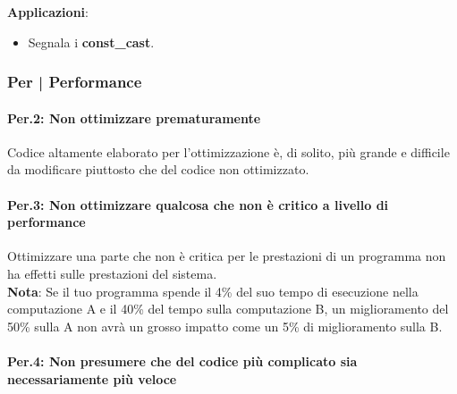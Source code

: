 \textsf{\small \textbf{Applicazioni}: }

\begin{itemize}
	\item \textsf{\small Segnala i \textbf{const\_cast}.}
\end{itemize}


\newpage

\subsubsection{Per | Performance}

\paragraph{Per.2: Non ottimizzare prematuramente}

\label{Per_2}

\textsf{\small Codice altamente elaborato per l'ottimizzazione è, di solito, più grande e difficile da modificare piuttosto che del codice non ottimizzato.} \\


\paragraph{Per.3: Non ottimizzare qualcosa che non è critico a livello di performance}

\textsf{\small Ottimizzare una parte che non è critica per le prestazioni di un programma non ha effetti sulle prestazioni del sistema. } \\

\textsf{\small \textbf{Nota}: Se il tuo programma spende il 4\% del suo tempo di esecuzione nella computazione A e il 40\% del tempo sulla computazione B, un miglioramento del 50\% sulla A non avrà un grosso impatto come un 5\% di miglioramento sulla B. } \\

\paragraph{Per.4: Non presumere che del codice più complicato sia necessariamente più veloce}

